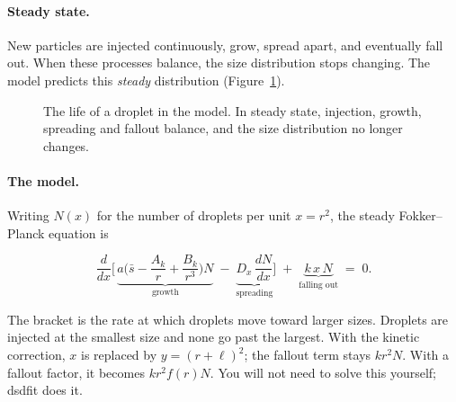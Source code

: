 \documentclass[11pt]{article}
\newcommand{\sbar}{\bar s}
\newcommand{\Dx}{D_x}
\begin{document}
\paragraph{Steady state.} New particles are injected continuously, grow, spread apart, and eventually fall
out. When these processes balance, the size distribution stops changing. The model predicts this
\emph{steady} distribution (Figure~\ref{fig:schematic}).

\begin{figure}[h]
\centering
{}
\caption{The life of a droplet in the model. In steady state, injection, growth, spreading and fallout
balance, and the size distribution no longer changes.}
\label{fig:schematic}
\end{figure}

\paragraph{The model.} Writing $N(x)$ for the number of droplets per unit $x = r^2$, the steady
Fokker--Planck equation is
\begin{mathbox}
\begin{equation}
\frac{d}{dx}\Big[\,\underbrace{a\Big(\sbar - \frac{A_k}{r} + \frac{B_k}{r^3}\Big)N}_{\text{growth}}
\;-\; \underbrace{\Dx\,\frac{dN}{dx}}_{\text{spreading}}\Big]
\;+\; \underbrace{k\,x\,N}_{\text{falling out}} \;=\; 0 .
\label{eq:fp}
\end{equation}
\end{mathbox}
The bracket is the rate at which droplets move toward larger sizes. Droplets are injected at the smallest
size and none go past the largest. With the kinetic correction, $x$ is replaced by $y = (r+\ell)^2$; the
fallout term stays $k r^2 N$. With a fallout factor, it becomes $k r^2 f(r) N$. You will not need to solve
this yourself; dsdfit does it.
\end{document}
